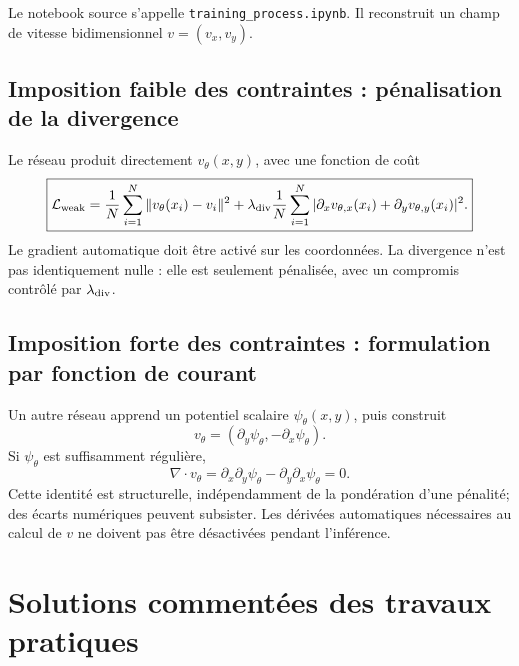 \documentclass[11pt,a4paper]{article}
\begin{document}
Le notebook source s'appelle \texttt{training\_process.ipynb}. Il reconstruit un champ de vitesse bidimensionnel $v=(v_x,v_y)$.

\subsection{Imposition faible des contraintes : pénalisation de la divergence}

Le réseau produit directement $v_\theta(x,y)$, avec une fonction de coût
\[\boxed{\mathcal L_{\rm weak}=\frac1N\sum_{i=1}^N\|v_\theta(x_i)-v_i\|^2+\lambda_{\rm div}\frac1N\sum_{i=1}^N|\partial_x v_{\theta,x}(x_i)+\partial_y v_{\theta,y}(x_i)|^2.}\]
Le gradient automatique doit être activé sur les coordonnées. La divergence n'est pas identiquement nulle : elle est seulement pénalisée, avec un compromis contrôlé par $\lambda_{\rm div}$.

\subsection{Imposition forte des contraintes : formulation par fonction de courant}

Un autre réseau apprend un potentiel scalaire $\psi_\theta(x,y)$, puis construit
\[\boxed{v_\theta=(\partial_y\psi_\theta,-\partial_x\psi_\theta).}\]
Si $\psi_\theta$ est suffisamment régulière,
\[\nabla\cdot v_\theta=\partial_x\partial_y\psi_\theta-\partial_y\partial_x\psi_\theta=0.\]
Cette identité est structurelle, indépendamment de la pondération d'une pénalité; des écarts numériques peuvent subsister. Les dérivées automatiques nécessaires au calcul de $v$ ne doivent pas être désactivées pendant l'inférence.
\begin{center}\end{center}

\section{Solutions commentées des travaux pratiques}
\end{document}
